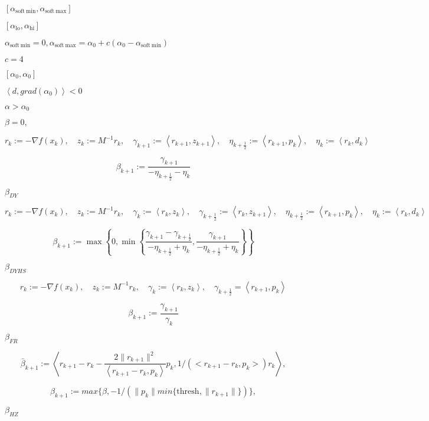 \documentclass{article}
\begin{document}
$ [\alpha_{\mathrm{soft~min}}, \alpha_{\mathrm{soft~max}}] $
\pagebreak

$ [\alpha_{\mathrm{lo}}, \alpha_{\mathrm{hi}}] $
\pagebreak

$ \alpha_{\mathrm{soft~min}} = 0, \alpha_{\mathrm{soft~max}} = \alpha_0 + c(\alpha_0 -
\alpha_{\mathrm{soft~min}}) $
\pagebreak

$ c = 4$
\pagebreak

$ [\alpha_0, \alpha_0]$
\pagebreak

$ \left< d, grad(\alpha_0) \right> < 0 $
\pagebreak

$ \alpha > \alpha_0 $
\pagebreak

$ \beta = 0,$
\pagebreak

\[
  r_k := -\nabla f(x_k), \quad z_k := M^{-1} r_k, \quad  \gamma_{k+1} := \left< r_{k+1}, z_{k+1} \right>,
  \quad \eta_{k+\frac{1}{2}} := \left<r_{k+1}, p_k \right>, \quad \eta_k := \left<r_k, d_k\right>
\]
\pagebreak

\[
  \beta_{k+1} := \frac{\gamma_{k+1}}{ - \eta_{k+\frac{1}{2}} - \eta_k}
\]
\pagebreak

$ \beta_{DY}$
\pagebreak

\[
  r_k := -\nabla f(x_k), \quad z_k := M^{-1} r_k, \quad  \gamma_k := \left< r_k, z_k \right>, \quad
  \gamma_{k+\frac{1}{2}} := \left< r_k, z_{k+1} \right>, \quad
  \eta_{k+\frac{1}{2}} := \left<r_{k+1}, p_k \right>, \quad \eta_k := \left<r_k, d_k\right>
\]
\pagebreak

\[
  \beta_{k+1} := \max \left\{0, \min \left\{ \frac{\gamma_{k+1} - \gamma_{k+\frac{1}{2}}}{ - \eta_{k+\frac{1}{2}}+ \eta_k}, \frac{\gamma_{k+1}}{ - \eta_{k+\frac{1}{2}}+ \eta_k} \right\} \right\}
\]
\pagebreak

$ \beta_{DYHS}$
\pagebreak

\[
  r_k := -\nabla f(x_k), \quad z_k := M^{-1} r_k, \quad  \gamma_k := \left< r_k, z_k \right>, \quad
  \gamma_{k+\frac{1}{2}} = \left<r_{k+1}, p_k \right>
\]
\pagebreak

\[
  \beta_{k+1} := \frac{\gamma_{k+1}}{\gamma_k}
\]
\pagebreak

$ \beta_{FR}$
\pagebreak

\[
  \bar{\beta}_{k+1} := \left< r_{k+1} -r_k - \frac{2 \|r_{k+1}\|^2}{\left< r_{k+1} - r_k, p_k \right>}
  p_k, 1/(<r_{k+1} - r_k, p_k>) r_k \right>,
\]
\pagebreak

\[
  \beta_{k+1} := max\{ \beta, -1/ \left( \| p_k \| min\{ \mathrm{thresh}, \| r_{k+1} \| \} \right) \},
\]
\pagebreak

$ \beta_{HZ}$
\pagebreak
\end{document}
